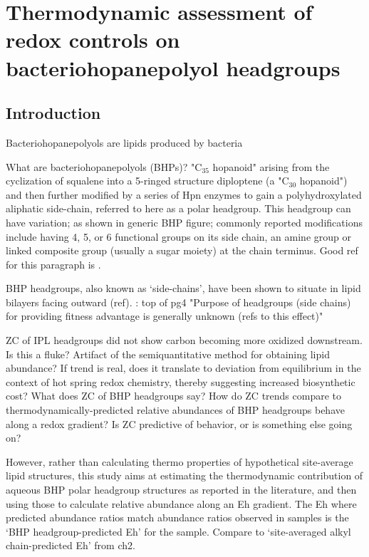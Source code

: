 \chapter{Thermodynamic assessment of redox controls on bacteriohopanepolyol headgroups}\label{ch3}


\section{Introduction}

Bacteriohopanepolyols are lipids produced by bacteria

What are bacteriohopanepolyols (BHPs)? "C$_{35}$ hopanoid" arising from the cyclization of squalene into a 5-ringed structure diploptene (a "C$_{30}$ hopanoid") and then further modified by a series of Hpn enzymes to gain a polyhydroxylated aliphatic side-chain, referred to here as a polar headgroup. This headgroup can have variation; as shown in generic BHP figure; commonly reported modifications include having 4, 5, or 6 functional groups on its side chain, an amine group or linked composite group (usually a sugar moiety) at the chain terminus. Good ref for this paragraph is \citep{belin2018hopanoid}.

BHP headgroups, also known as `side-chains', have been shown to situate in lipid bilayers facing outward (ref).
\citep{belin2018hopanoid}: top of pg4 "Purpose of headgroups (side chains) for providing fitness advantage is generally unknown (refs to this effect)"

ZC of IPL headgroups did not show carbon becoming more oxidized downstream. Is this a fluke? Artifact of the semiquantitative method for obtaining lipid abundance? If trend is real, does it translate to deviation from equilibrium in the context of hot spring redox chemistry, thereby suggesting increased biosynthetic cost? What does ZC of BHP headgroups say? How do ZC trends compare to thermodynamically-predicted relative abundances of BHP headgroups behave along a redox gradient? Is ZC predictive of behavior, or is something else going on?

However, rather than calculating thermo properties of hypothetical site-average lipid structures, this study aims at estimating the thermodynamic contribution of aqueous BHP polar headgroup structures as reported in the literature, and then using those to calculate relative abundance along an Eh gradient. The Eh where predicted abundance ratios match abundance ratios observed in samples is the `BHP headgroup-predicted Eh' for the sample. Compare to `site-averaged alkyl chain-predicted Eh' from ch2.

